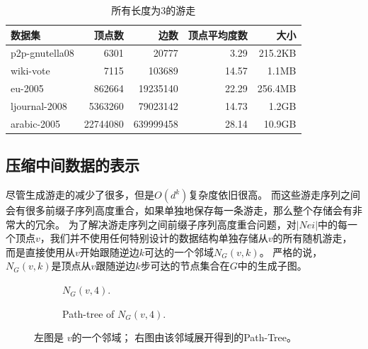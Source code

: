 \documentclass[master]{njuthesis}
\begin{document}
\begin{table}[h]
\caption{所有长度为3的游走}
\label{tab:dataset1}
\centering
\begin{tabular}{|l|r|r|r|r|}
\hline
\textbf{数据集} & \textbf{顶点数} & \textbf{边数} & \textbf{顶点平均度数} & \textbf{大小} \\
\hline
p2p-gnutella08 \footnotemark[1]  & {6301}         & \num{20777}                   & 3.29                & 215.2KB\\
\hline
wiki-vote \footnotemark[2]    & 7115 	& \num{103689}                           &14.57                & 1.1MB  \\
\hline
eu-2005       \footnotemark[3]     & \num{862664}  & \num{19235140 }          & 22.29             & 256.4MB\\
\hline
ljournal-2008  \footnotemark[4] & \num{5363260} & \num{79023142}         & 14.73            &1.2GB\\
\hline
arabic-2005 \footnotemark[5]   & \num{22744080} & \num{639999458}      & 28.14           & 10.9GB\\
\hline
\end{tabular}
\end{table}
\fi
\subsection{压缩中间数据的表示}
尽管生成游走的减少了很多，但是$O(d^k)$复杂度依旧很高。
而这些游走序列之间会有很多前缀子序列高度重合，如果单独地保存每一条游走，那么整个存储会有非常大的冗余。
为了解决游走序列之间前缀子序列高度重合问题，对$|Nei|$中的每一个顶点$v$，我们并不使用任何特别设计的数据结构单独存储从$v$的所有随机游走，
而是直接使用从$v$开始跟随逆边$k$可达的一个邻域$N_{G}(v, k)$。
严格的说，$N_{G}(v, k)$是顶点从$v$跟随逆边$k$步可达的节点集合在$G$中的生成子图。
\begin{figure}[h]
    \centering
    \begin{subfigure}[b]{0.48\linewidth}        %
        \centering
        \label{fig:match_walks_one}
	\resizebox{!}{!}{}
	\caption{$N_G(v, 4)$.}
	
	\end{subfigure}
    \begin{subfigure}[b]{0.48\linewidth}        %
     \centering
	\resizebox{!}{!}{}
	\caption{Path-tree of $N_G(v, 4)$.}
	\label{fig:match_walks_two}
    \end{subfigure}
    \caption{左图是 $v $的一个邻域； 右图由该邻域展开得到的Path-Tree。}
    \label{fig:match_walks}
\end{figure}
\end{document}
